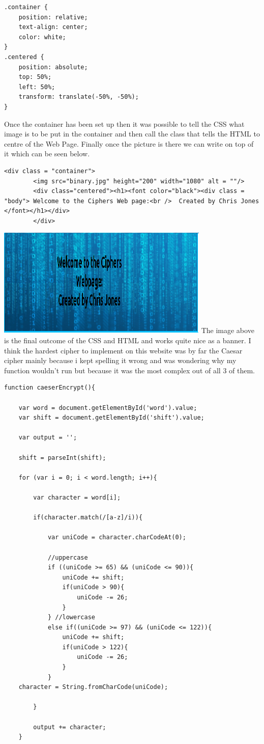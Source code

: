 \documentclass[10pt, a4paper]{article}
\begin{document}
\begin{lstlisting}
.container {
    position: relative;
    text-align: center;
    color: white;
}
.centered {
    position: absolute;
    top: 50%;
    left: 50%;
    transform: translate(-50%, -50%);
}

\end{lstlisting}
Once the container has been set up then it was possible to tell the CSS what image is to be put in the container and then call the class that tells the HTML to centre of the Web Page. Finally once the picture is there we can write on top of it which can be seen below. 
\begin{lstlisting}
<div class = "container">
		<img src="binary.jpg" height="200" width="1080" alt = ""/>
		<div class="centered"><h1><font color="black"><div class = "body"> Welcome to the Ciphers Web page:<br />  Created by Chris Jones </font></h1></div>
		</div>
\end{lstlisting}
\includegraphics{images/banner.png}
The image above is the final outcome of the CSS and HTML and works quite nice as a banner.
I think the hardest cipher to implement on this website was by far the Caesar cipher mainly because i kept spelling it wrong and was wondering why my function wouldn't run but because it was the most complex out of all 3 of them.
\begin{lstlisting}
function caeserEncrypt(){

	var word = document.getElementById('word').value;
	var shift = document.getElementById('shift').value;

	var output = '';

	shift = parseInt(shift);

	for (var i = 0; i < word.length; i++){

		var character = word[i];

		if(character.match(/[a-z]/i)){

			var uniCode = character.charCodeAt(0);

			//uppercase
			if ((uniCode >= 65) && (uniCode <= 90)){
				uniCode += shift;
				if(uniCode > 90){
					uniCode -= 26;
				}
			} //lowercase
			else if((uniCode >= 97) && (uniCode <= 122)){
				uniCode += shift;
				if(uniCode > 122){
					uniCode -= 26;
				}
			}
    character = String.fromCharCode(uniCode);

		}

		output += character;
	}
\end{lstlisting}
\end{document}
